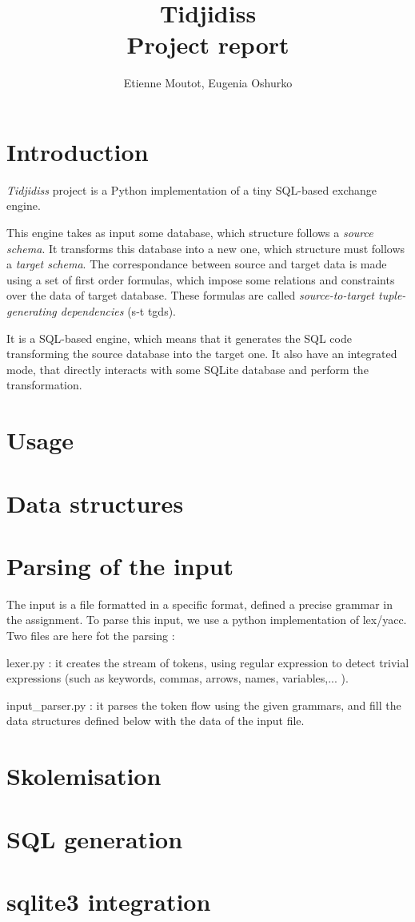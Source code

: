 \documentclass[a4paper,11pt]{article}
\title{{\Huge Tidjidiss}\\
Project report}
\author{Etienne Moutot, Eugenia Oshurko}
\begin{document}
\maketitle

\section{Introduction}
\textit{Tidjidiss} project is a Python implementation of a tiny SQL-based exchange engine.

This engine takes as input some database, which structure follows a \textit{source schema}. It transforms this database into a new one, which structure must follows a \textit{target schema}. The correspondance between source and target data is made using a set of first order formulas, which impose some relations and constraints over the data of target database. These formulas are called \textit{source-to-target tuple-generating dependencies} (s-t tgds).

It is a SQL-based engine, which means that it generates the SQL code transforming the source database into the target one. It also have an integrated mode, that directly interacts with some SQLite database and perform the transformation.

\section{Usage}
\section{Data structures}
\section{Parsing of the input}
The input is a file formatted in a specific format, defined a precise grammar in the assignment. To parse this input, we use a python implementation of lex/yacc. Two files are here fot the parsing :
\begin{enumeration} 
  \item lexer.py : it creates the stream of tokens, using regular expression to detect trivial expressions (such as keywords, commas, arrows, names, variables,... ). 
  \item input_parser.py : it parses the token flow using the given grammars, and fill the data structures defined below with the data of the input file. 
\end{enumeration} 

\section{Skolemisation}
\section{SQL generation}
\section{sqlite3 integration}
\end{document}
